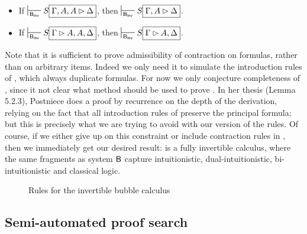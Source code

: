 \begin{lemma}
  ~\\\vspace{-1em}
  \begin{itemize}
    \item If $\prov{\msys{B_{inv}}} S\select{\Gamma, A, A \J \Delta}$, then
          $\prov{\msys{B_{inv}}} S\select{\Gamma, A \J \Delta}$.
    \item If $\prov{\msys{B_{inv}}} S\select{\Gamma \J A, A, \Delta}$, then
          $\prov{\msys{B_{inv}}} S\select{\Gamma \J A, \Delta}$.
  \end{itemize}
\end{lemma}

Note that it is sufficient to prove admissibility of contraction on formulas,
rather than on arbitrary items. Indeed we only need it to simulate the
introduction rules of , which always duplicate formulas. For now we
only conjecture completeness of , since it not clear what method
should be used to prove . In her thesis
\cite{postniece_proof_2010} (Lemma 5.2.3), Postniece does a proof by recurrence
on the depth of the derivation, relying on the fact that all introduction rules
of  preserve the principal formula; but this is precisely what we
are trying to avoid with our version of the rules. Of course, if we either give
up on this constraint or include contraction rules in , then we
immediately get our desired result:  is a fully invertible
calculus, where the same fragments as system $\sysB$ capture intuitionistic,
dual-intuitionistic, bi-intuitionistic and classical logic.

\begin{figure*}
  
  \caption{Rules for the invertible bubble calculus }
\end{figure*}

\subsection{Semi-automated proof search}

